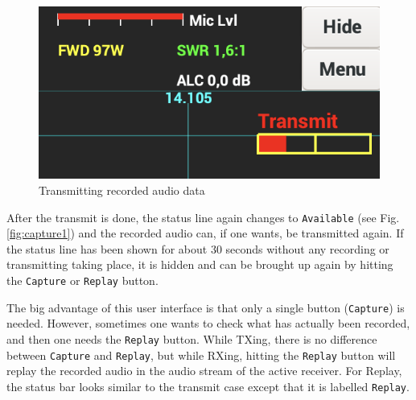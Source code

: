 \documentclass[12pt]{book}
\def\rett#1{\texttt{\color{red}#1}}
\def\bltt#1{\texttt{\color{blue}#1}}
\begin{document}
\begin{figure}[ht]
\center
\includegraphics[scale=0.45]{Capture2.png}
\caption{Transmitting recorded audio data}
\label{fig:capture2}
\end{figure}

After the transmit is done, the status line again changes to \rett{Available} (see Fig. \ref{fig:capture1})
and the recorded audio can, if one wants, be transmitted again. If the status line has been shown for about
30 seconds without any recording or transmitting taking place, it is hidden and can be brought up again by
hitting the \bltt{Capture} or \bltt{Replay} button.

The big advantage of this user interface is that only a single button (\bltt{Capture}) is needed. However,
sometimes one wants to check what has actually been recorded, and then one needs the
\bltt{Replay} button. While TXing, there is no difference between \bltt{Capture} and
\bltt{Replay}, but while RXing, hitting the \bltt{Replay} button will replay the recorded audio
in the audio stream of the active receiver. For Replay, the status bar looks similar to the transmit case except
that it is labelled \rett{Replay}.
\end{document}
